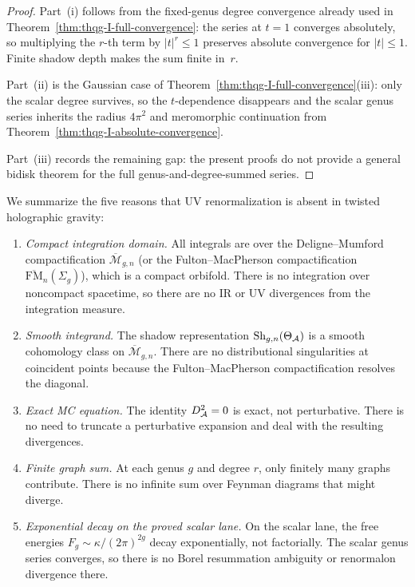 \begin{proof}
Part~(i) follows from the fixed-genus degree convergence already used in
Theorem~\ref{thm:thqg-I-full-convergence}: the series at $t=1$
converges absolutely, so multiplying the $r$-th term by $|t|^r \leq 1$
preserves absolute convergence for $|t| \leq 1$. Finite shadow depth
makes the sum finite in~$r$.

Part~(ii) is the Gaussian case of
Theorem~\ref{thm:thqg-I-full-convergence}\textup{(iii)}: only the scalar
degree survives, so the $t$-dependence disappears and the scalar genus
series inherits the radius $4\pi^2$ and meromorphic continuation from
Theorem~\ref{thm:thqg-I-absolute-convergence}.

Part~(iii) records the remaining gap: the present proofs do not provide
a general bidisk theorem for the full genus-and-degree-summed series.
\end{proof}

\begin{remark}
\label{rem:thqg-I-no-uv-detailed}
We summarize the five reasons that UV renormalization is absent in twisted holographic gravity:
\begin{enumerate}[label=\textup{(\arabic*)}]
\item \emph{Compact integration domain.} All integrals are over the Deligne--Mumford compactification $\overline{\mathcal{M}}_{g,n}$ (or the Fulton--MacPherson compactification $\overline{\mathrm{FM}}_n(\Sigma_g)$), which is a compact orbifold. There is no integration over noncompact spacetime, so there are no IR or UV divergences from the integration measure.
\item \emph{Smooth integrand.} The shadow representation $\operatorname{Sh}_{g,n}(\Theta_{\mathcal{A}})$ is a smooth cohomology class on $\overline{\mathcal{M}}_{g,n}$. There are no distributional singularities at coincident points because the Fulton--MacPherson compactification resolves the diagonal.
\item \emph{Exact MC equation.} The identity $D_{\mathcal{A}}^2 = 0$ is exact, not perturbative. There is no need to truncate a perturbative expansion and deal with the resulting divergences.
\item \emph{Finite graph sum.} At each genus $g$ and degree $r$, only finitely many graphs contribute. There is no infinite sum over Feynman diagrams that might diverge.
\item \emph{Exponential decay on the proved scalar lane.} On the
scalar lane, the free energies
$F_g \sim \kappa/(2\pi)^{2g}$ decay exponentially, not factorially. The
scalar genus series converges, so there is no Borel resummation
ambiguity or renormalon divergence there.
\end{enumerate}
\end{remark}

